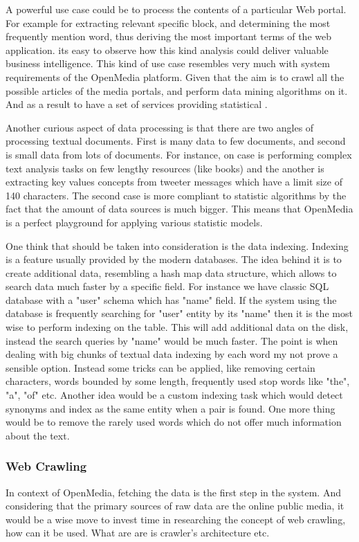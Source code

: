 A powerful use case could be to process the contents of a particular Web portal. For example for extracting relevant specific block, and determining the most frequently mention word, thus deriving the most important terms of the web application. its easy to observe how this kind analysis could deliver valuable business intelligence. This kind of use case resembles very much with system requirements of the OpenMedia platform. Given that the aim is to crawl all the possible articles of the media portals, and perform data mining algorithms on it. And as a result to have a set of services providing statistical .

Another curious aspect of data processing is that there are two angles of processing textual documents. First is many data to few documents, and second is small data from lots of documents. For instance, on case is performing complex text analysis tasks on few lengthy resources (like books) and the another is extracting key values concepts from tweeter messages which have a limit size of 140 characters. The second case is more compliant to statistic algorithms by the fact that the amount of data sources is much bigger. This means that OpenMedia is a perfect playground for applying various statistic models.

One think that should be taken into consideration is the data indexing. Indexing is a feature usually provided by the modern databases. The idea behind it is to create additional data, resembling a hash map data structure, which allows to search data much faster by a specific field. For instance we have classic SQL database with a "user" schema which has "name" field. If the system using the database is frequently searching for "user" entity by its "name" then it is the most wise to perform indexing on the table. This will add additional data on the disk, instead the search queries by "name" would be much faster. The point is when dealing with big chunks of textual data indexing by each word my not prove a sensible option. Instead some tricks can be applied, like removing certain characters, words bounded by some length, frequently used stop words like "the", "a", "of" etc. Another idea would be a custom indexing task which would detect synonyms and index as the same entity when a pair is found. One more thing would be to remove the rarely used words which do not offer much information about the text.

\subsubsection{Web Crawling}
In context of OpenMedia, fetching the data is the first step in the system. And considering that the primary sources of raw data are the online public media, it would be a wise move to invest time in researching the concept of web crawling, how can it be used. What are are is crawler's architecture etc.


